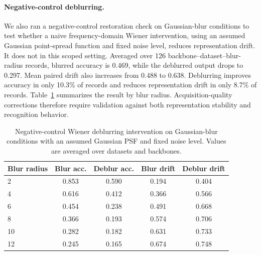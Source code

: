 \documentclass[a4paper,fleqn]{els-cas-templates/cas-sc}
\begin{document}
\paragraph{Negative-control deblurring.}
We also ran a negative-control restoration check on Gaussian-blur conditions to
test whether a naive frequency-domain Wiener intervention, using an assumed
Gaussian point-spread function and fixed noise level, reduces representation
drift. It does not in this scoped setting. Averaged over 126
backbone--dataset--blur-radius records, blurred accuracy is 0.469, while the
deblurred output drops to 0.297. Mean paired drift also increases from 0.488 to
0.638. Deblurring improves accuracy in only 10.3\% of records and reduces
representation drift in only 8.7\% of records. Table~\ref{tab:deblur}
summarizes the result by blur radius. Acquisition-quality corrections therefore
require validation against both representation stability and recognition
behavior.

\begin{table}[pos=htbp]
\centering
\caption{Negative-control Wiener deblurring intervention on Gaussian-blur conditions with an assumed Gaussian PSF and fixed noise level. Values are averaged over datasets and backbones.}
\label{tab:deblur}
\small
\begin{tabular}{lcccc}
\toprule
Blur radius & Blur acc. & Deblur acc. & Blur drift & Deblur drift \\
\midrule
2  & 0.853 & 0.590 & 0.194 & 0.404 \\
4  & 0.616 & 0.412 & 0.366 & 0.566 \\
6  & 0.454 & 0.238 & 0.491 & 0.668 \\
8  & 0.366 & 0.193 & 0.574 & 0.706 \\
10 & 0.282 & 0.182 & 0.631 & 0.733 \\
12 & 0.245 & 0.165 & 0.674 & 0.748 \\
\bottomrule
\end{tabular}
\end{table}
\end{document}

